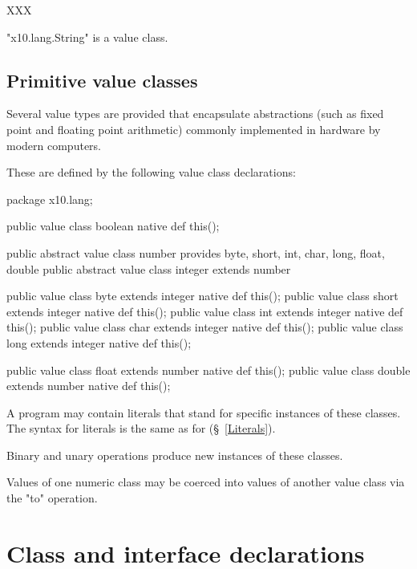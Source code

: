 XXX

\xcd"x10.lang.String" is a value class.


\subsection{Primitive value classes}

Several value types are provided that encapsulate
abstractions (such as fixed point and floating point arithmetic)
commonly implemented in hardware by modern computers.

These are defined by the following value class declarations:
\begin{xten}
package x10.lang;

public value class boolean { native def this(); }

public abstract value class number
    provides byte, short, int, char, long, float, double { }
public abstract value class integer extends number { }

public value class byte extends integer  { native def this(); }
public value class short extends integer { native def this(); }
public value class int extends integer   { native def this(); }
public value class char extends integer  { native def this(); }
public value class long extends integer  { native def this(); }

public value class float extends number  { native def this(); }
public value class double extends number { native def this(); }
\end{xten}

A program may contain literals
that stand for specific instances of these classes. The syntax
for literals is the same as for \java{} (\S~\ref{Literals}).

Binary and unary operations produce new instances of these
classes.

Values of one numeric class may be coerced into values of
another value class via the \xcd"to" operation.





\section{Class and interface declarations}\label{DepType:Class}

